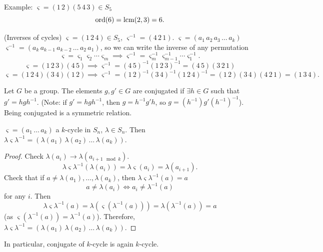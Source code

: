 \documentclass[10pt, a4paper]{article}
\begin{document}
Example:
$\varsigma = (1\, 2)(5\, 4\, 3) \in S_5$
\[
\operatorname{ord}(6) = \operatorname{lcm}(2, 3) = 6.
\]

\begin{example}
    (Inverses of cycles)
    $\varsigma = (1\, 2\, 4) \in S_5$,
    $\varsigma ^ {-1} = (4\, 2\, 1)$.
    $\varsigma = (a_1\, a_2\, a_3\, \dotsc\, a_k)$
    $\varsigma ^ {-1} = (a_k\, a_{k - 1}\, a_{k - 2}\, \dotsc\, a_2\, a_1)$,
    so we can write the inverse of any permutation
    \[
    \varsigma = \varsigma_1 \varsigma_2 \dotsi \varsigma_m \implies \varsigma ^ {-1} = \varsigma_m ^ {-1}\varsigma_{m - 1} ^ {-1} \dotsi \varsigma_1 ^ {-1}.
    \]
    \[
    \varsigma = (1\,2\,3)(4\,5) \implies \varsigma ^ {-1} = (4\,5) ^ {-1}(1\,2\,3) ^ {-1} = (4\,5)(3\,2\,1)
    \]
    \[
    \varsigma = (1\,2\,4)(3\,4)(1\,2) \implies \varsigma ^ {-1} = (1\,2) ^ {-1}(3\,4) ^ {-1}(1\,2\,4) ^ {-1} = (1\,2)(3\,4)(4\,2\,1) = (1\,3\,4).
    \]
\end{example}

\begin{definition}
    Let $G$ be a group.
    The elements $g, g' \in G$ are conjugated if $\exists h \in G$ such that $g' = hgh ^ {-1}$.
    (Note:
    if $g' = hgh ^ {-1}$,
    then $g = h ^ {-1}g'h$,
    so $g = (h ^ {-1})g'(h ^ {-1}) ^ {-1}$).
    Being conjugated is a symmetric relation.
\end{definition}

\begin{lemma}
    $\varsigma = (a_1\,\dotsc\,a_k)$ a $k$-cycle in $S_n$,
    $\lambda \in S_n$.
    Then $\lambda \varsigma \lambda ^ {-1} = (\lambda(a_1)\,\lambda(a_2)\,\dotsc\,\lambda(a_k))$.

    \begin{proof}
        Check $\lambda(a_i) \to \lambda(a_{i + 1\mod{k}})$.
        \[
        \lambda\varsigma\lambda ^ {-1}(\lambda(a_i)) = \lambda\varsigma(a_i) = \lambda(a_{i + 1}).
        \]
        Check that if $a \neq \lambda(a_1), \dotsc, \lambda(a_k)$,
        then $\lambda\varsigma\lambda ^ {-1}(a) = a$
        \[
        a \neq \lambda(a_i) \iff a_i \neq \lambda ^ {-1}(a)
        \]
        for any $i$.
        Then
        \[
        \lambda\varsigma\lambda ^ {-1}(a) = \lambda(\varsigma(\lambda ^ {-1}(a))) = \lambda(\lambda ^ {-1}(a)) = a
        \]
        (as $\varsigma(\lambda ^ {-1}(a)) = \lambda ^ {-1}(a)$).
        Therefore,
        $\lambda\varsigma\lambda ^ {-1} = (\lambda(a_1)\,\lambda(a_2)\,\dotsc\,\lambda(a_k))$.
    \end{proof}
\end{lemma}
In particular,
conjugate of $k$-cycle is again $k$-cycle.
\end{document}
